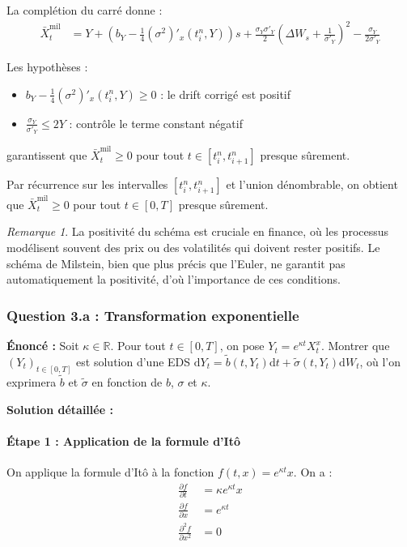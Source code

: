 \documentclass[12pt,a4paper]{article}
\theoremstyle{definition}
\theoremstyle{remark}
\newtheorem*{remark}{Remarque}
\newcommand{\R}{\mathbb{R}}
\newcommand{\dd}{\mathrm{d}}
\begin{document}
La complétion du carré donne :
\begin{align*}
\bar{X}_t^{\text{mil}} &= Y + \left(b_Y - \frac{1}{4}(\sigma^2)'_x(t_i^n, Y)\right)s + \frac{\sigma_Y \sigma'_Y}{2}\left(\Delta W_s + \frac{1}{\sigma'_Y}\right)^2 - \frac{\sigma_Y}{2\sigma'_Y}
\end{align*}

Les hypothèses :
\begin{itemize}
\item $b_Y - \frac{1}{4}(\sigma^2)'_x(t_i^n, Y) \geq 0$ : le drift corrigé est positif
\item $\frac{\sigma_Y}{\sigma'_Y} \leq 2Y$ : contrôle le terme constant négatif
\end{itemize}

garantissent que $\bar{X}_t^{\text{mil}} \geq 0$ pour tout $t \in [t_i^n, t_{i+1}^n]$ presque sûrement.

Par récurrence sur les intervalles $[t_i^n, t_{i+1}^n]$ et l'union dénombrable, on obtient que $\bar{X}_t^{\text{mil}} \geq 0$ pour tout $t \in [0,T]$ presque sûrement.

\begin{remark}
La positivité du schéma est cruciale en finance, où les processus modélisent souvent des prix ou des volatilités qui doivent rester positifs. Le schéma de Milstein, bien que plus précis que l'Euler, ne garantit pas automatiquement la positivité, d'où l'importance de ces conditions.
\end{remark}

\subsubsection{Question 3.a : Transformation exponentielle}

\textbf{Énoncé :} Soit $\kappa \in \R$. Pour tout $t \in [0,T]$, on pose $Y_t = e^{\kappa t}X_t^x$. Montrer que $(Y_t)_{t \in [0,T]}$ est solution d'une EDS $\dd Y_t = \tilde{b}(t,Y_t)\dd t + \tilde{\sigma}(t,Y_t)\dd W_t$, où l'on exprimera $\tilde{b}$ et $\tilde{\sigma}$ en fonction de $b$, $\sigma$ et $\kappa$.

\textbf{Solution détaillée :}

\paragraph{Étape 1 : Application de la formule d'Itô}
On applique la formule d'Itô à la fonction $f(t,x) = e^{\kappa t}x$. On a :
\begin{align*}
\frac{\partial f}{\partial t} &= \kappa e^{\kappa t}x \\
\frac{\partial f}{\partial x} &= e^{\kappa t} \\
\frac{\partial^2 f}{\partial x^2} &= 0
\end{align*}
\end{document}
